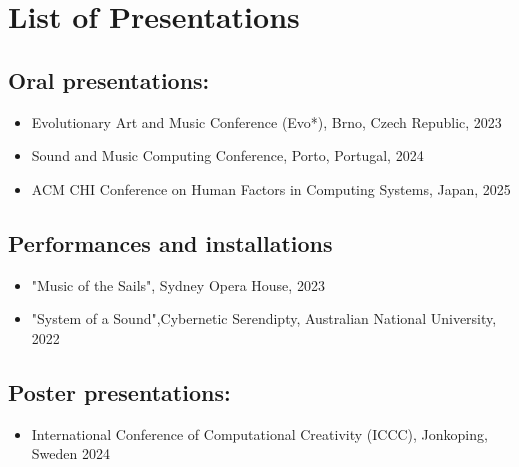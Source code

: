 \section*{List of Presentations}

\subsection*{Oral presentations:} 

\begin{itemize}
\item Evolutionary Art and Music Conference (Evo*), Brno, Czech Republic, 2023
\item Sound and Music Computing Conference, Porto, Portugal, 2024
\item ACM CHI Conference on Human Factors in Computing Systems, Japan, 2025


\end{itemize}


\subsection*{Performances and installations}

\begin{itemize}
    \item "Music of the Sails", Sydney Opera House, 2023
    \item "System of a Sound",Cybernetic Serendipty, Australian National University, 2022
\end{itemize}

\subsection*{Poster presentations:}

\begin{itemize}
    \item International Conference of Computational Creativity (ICCC), Jonkoping, Sweden 2024
\end{itemize}


